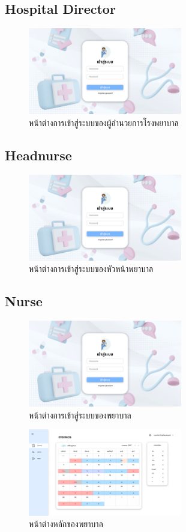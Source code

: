 \subsection{Hospital Director}

\begin{figure}[h]
    \centering
    \includegraphics[width=0.6\textwidth]{Login ui.png}
    \caption{หน้าต่างการเข้าสู่ระบบของผู้อำนวยการโรงพยาบาล}
    \end{figure}

\subsection{Headnurse}

\begin{figure}[h]
    \centering
    \includegraphics[width=0.6\textwidth]{Login ui.png}
    \caption{หน้าต่างการเข้าสู่ระบบของหัวหน้าพยาบาล}
    \end{figure}

\subsection{Nurse}

\begin{figure}[h]
    \centering
    \includegraphics[width=0.6\textwidth]{Login ui.png}
    \caption{หน้าต่างการเข้าสู่ระบบของพยาบาล}
    \end{figure}

\begin{figure}
    \centering
    \includegraphics[width=0.6\textwidth]{Home ui.png}
    \caption{หน้าต่างหลักของพยาบาล}
\end{figure}
